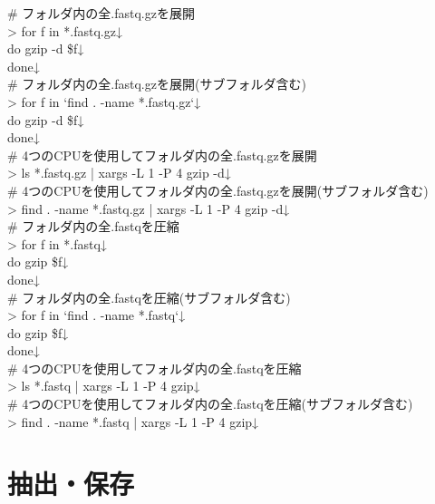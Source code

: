 \documentclass[titlepage,10pt,a4paper]{jsbook}
\newenvironment{cmd}{\begin{oframed}\raggedright\ttfamily\footnotesize\setlength{\baselineskip}{1.4em}}{\end{oframed}\vspace{-1em}}
\begin{document}
\begin{cmd}
\# フォルダ内の全.fastq.gzを展開\\
{\textgreater} for f in *.fastq.gz↓\\
do gzip -d \$f↓\\
done↓\\
\# フォルダ内の全.fastq.gzを展開(サブフォルダ含む)\\
{\textgreater} for f in `find . -name *.fastq.gz`↓\\
do gzip -d \$f↓\\
done↓\\
\# 4つのCPUを使用してフォルダ内の全.fastq.gzを展開\\
{\textgreater} ls *.fastq.gz | xargs -L 1 -P 4 gzip -d↓\\
\# 4つのCPUを使用してフォルダ内の全.fastq.gzを展開(サブフォルダ含む)\\
{\textgreater} find . -name *.fastq.gz | xargs -L 1 -P 4 gzip -d↓\\
\# フォルダ内の全.fastqを圧縮\\
{\textgreater} for f in *.fastq↓\\
do gzip \$f↓\\
done↓\\
\# フォルダ内の全.fastqを圧縮(サブフォルダ含む)\\
{\textgreater} for f in `find . -name *.fastq`↓\\
do gzip \$f↓\\
done↓\\
\# 4つのCPUを使用してフォルダ内の全.fastqを圧縮\\
{\textgreater} ls *.fastq | xargs -L 1 -P 4 gzip↓\\
\# 4つのCPUを使用してフォルダ内の全.fastqを圧縮(サブフォルダ含む)\\
{\textgreater} find . -name *.fastq | xargs -L 1 -P 4 gzip↓
\end{cmd}

\section{抽出・保存}
\end{document}
